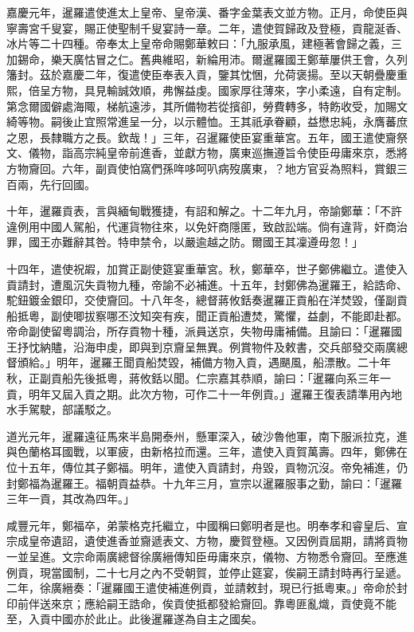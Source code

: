 \begin{pinyinscope}
嘉慶元年，暹羅遣使進太上皇帝、皇帝漢、番字金葉表文並方物。正月，命使臣與寧壽宮千叟宴，賜正使聖制千叟宴詩一章。二年，遣使賀歸政及登極，貢龍涎香、冰片等二十四種。帝奉太上皇帝命賜鄭華敕曰：「九服承風，建極著會歸之義，三加錫命，樂天廣怙冒之仁。舊典維昭，新綸用沛。爾暹羅國王鄭華屢供王會，久列籓封。茲於嘉慶二年，復遣使臣奉表入貢，鑒其忱悃，允荷褒揚。至以天朝疊慶重熙，倍呈方物，具見輸誠效順，弗懈益虔。國家厚往薄來，字小柔遠，自有定制。第念爾國僻處海陬，梯航遠涉，其所備物若從擯卻，勞費轉多，特飭收受，加賜文綺等物。嗣後止宜照常進呈一分，以示體恤。王其祇承眷顧，益懋忠純，永膺蕃庶之恩，長隸職方之長。欽哉！」三年，召暹羅使臣宴重華宮。五年，國王遣使齎祭文、儀物，詣高宗純皇帝前進香，並獻方物，廣東巡撫遵旨令使臣毋庸來京，悉將方物齎回。六年，副貢使怕窩們孫哖哆呵叭病歿廣東，？地方官妥為照料，賞銀三百兩，先行回國。

十年，暹羅貢表，言與緬甸戰獲捷，有詔和解之。十二年九月，帝諭鄭華：「不許違例用中國人駕船，代運貨物往來，以免奸商隱匿，致啟訟端。倘有違背，奸商治罪，國王亦難辭其咎。特申禁令，以嚴逾越之防。爾國王其凜遵毋忽！」

十四年，遣使祝嘏，加賞正副使筵宴重華宮。秋，鄭華卒，世子鄭佛繼立。遣使入貢請封，遭風沉失貢物九種，帝諭不必補進。十五年，封鄭佛為暹羅王，給誥命、駝鈕鍍金銀印，交使齎回。十八年冬，總督蔣攸銛奏暹羅正貢船在洋焚毀，僅副貢船抵粵，副使唧拔察哪丕汶知突有疾，聞正貢船遭焚，驚懼，益劇，不能即赴都。帝命副使留粵調治，所存貢物十種，派員送京，失物毋庸補備。且諭曰：「暹羅國王抒忱納贐，沿海申虔，即與到京齎呈無異。例賞物件及敕書，交兵部發交兩廣總督頒給。」明年，暹羅王聞貢船焚毀，補備方物入貢，遇颶風，船漂散。二十年秋，正副貢船先後抵粵，蔣攸銛以聞。仁宗嘉其恭順，諭曰：「暹羅向系三年一貢，明年又屆入貢之期。此次方物，可作二十一年例貢。」暹羅王復表請準用內地水手駕駛，部議駁之。

道光元年，暹羅遠征馬來半島開泰州，懸軍深入，破沙魯他軍，南下服派拉克，進與色蘭格耳國戰，以軍疲，由新格拉而還。三年，遣使入貢賀萬壽。四年，鄭佛在位十五年，傳位其子鄭福。明年，遣使入貢請封，舟毀，貢物沉沒。帝免補進，仍封鄭福為暹羅王。福朝貢益恭。十九年三月，宣宗以暹羅服事之勤，諭曰：「暹羅三年一貢，其改為四年。」

咸豐元年，鄭福卒，弟蒙格克托繼立，中國稱曰鄭明者是也。明奉孝和睿皇后、宣宗成皇帝遺詔，遺使進香並齎遞表文、方物，慶賀登極。又因例貢屆期，請將貢物一並呈進。文宗命兩廣總督徐廣縉傳知臣毋庸來京，儀物、方物悉令齎回。至應進例貢，現當國制，二十七月之內不受朝賀，並停止筵宴，俟嗣王請封時再行呈遞。二年，徐廣縉奏：「暹羅國王遣使補進例貢，並請敕封，現已行抵粵東。」帝命於封印前伴送來京；應給嗣王誥命，俟貢使抵都發給齎回。靠粵匪亂熾，貢使竟不能至，入貢中國亦於此止。此後暹羅遂為自主之國矣。


\end{pinyinscope}
